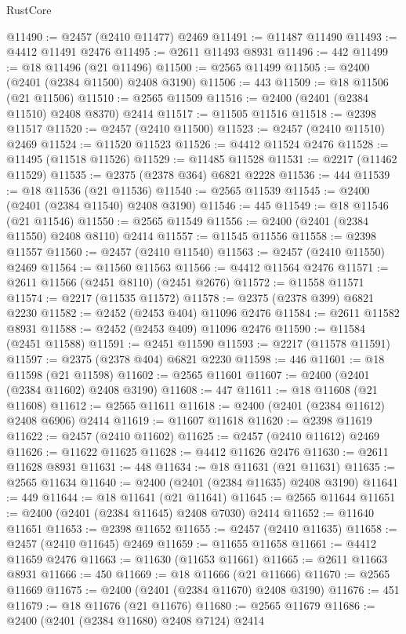 \begin{lexlean}{RustCore}
\begin{coremodule}
@11490 := @2457 (@2410 @11477) @2469
@11491 := @11487 @11490
@11493 := @4412 @11491 @2476
@11495 := @2611 @11493 @8931
@11496 := 442
@11499 := @18 @11496 (@21 @11496)
@11500 := @2565 @11499
@11505 := @2400 (@2401 (@2384 @11500) @2408 @3190)
@11506 := 443
@11509 := @18 @11506 (@21 @11506)
@11510 := @2565 @11509
@11516 := @2400 (@2401 (@2384 @11510) @2408 @8370) @2414
@11517 := @11505 @11516
@11518 := @2398 @11517
@11520 := @2457 (@2410 @11500)
@11523 := @2457 (@2410 @11510) @2469
@11524 := @11520 @11523
@11526 := @4412 @11524 @2476
@11528 := @11495 (@11518 @11526)
@11529 := @11485 @11528
@11531 := @2217 (@11462 @11529)
@11535 := @2375 (@2378 @364) @6821 @2228
@11536 := 444
@11539 := @18 @11536 (@21 @11536)
@11540 := @2565 @11539
@11545 := @2400 (@2401 (@2384 @11540) @2408 @3190)
@11546 := 445
@11549 := @18 @11546 (@21 @11546)
@11550 := @2565 @11549
@11556 := @2400 (@2401 (@2384 @11550) @2408 @8110) @2414
@11557 := @11545 @11556
@11558 := @2398 @11557
@11560 := @2457 (@2410 @11540)
@11563 := @2457 (@2410 @11550) @2469
@11564 := @11560 @11563
@11566 := @4412 @11564 @2476
@11571 := @2611 @11566 (@2451 @8110) (@2451 @2676)
@11572 := @11558 @11571
@11574 := @2217 (@11535 @11572)
@11578 := @2375 (@2378 @399) @6821 @2230
@11582 := @2452 (@2453 @404) @11096 @2476
@11584 := @2611 @11582 @8931
@11588 := @2452 (@2453 @409) @11096 @2476
@11590 := @11584 (@2451 @11588)
@11591 := @2451 @11590
@11593 := @2217 (@11578 @11591)
@11597 := @2375 (@2378 @404) @6821 @2230
@11598 := 446
@11601 := @18 @11598 (@21 @11598)
@11602 := @2565 @11601
@11607 := @2400 (@2401 (@2384 @11602) @2408 @3190)
@11608 := 447
@11611 := @18 @11608 (@21 @11608)
@11612 := @2565 @11611
@11618 := @2400 (@2401 (@2384 @11612) @2408 @6906) @2414
@11619 := @11607 @11618
@11620 := @2398 @11619
@11622 := @2457 (@2410 @11602)
@11625 := @2457 (@2410 @11612) @2469
@11626 := @11622 @11625
@11628 := @4412 @11626 @2476
@11630 := @2611 @11628 @8931
@11631 := 448
@11634 := @18 @11631 (@21 @11631)
@11635 := @2565 @11634
@11640 := @2400 (@2401 (@2384 @11635) @2408 @3190)
@11641 := 449
@11644 := @18 @11641 (@21 @11641)
@11645 := @2565 @11644
@11651 := @2400 (@2401 (@2384 @11645) @2408 @7030) @2414
@11652 := @11640 @11651
@11653 := @2398 @11652
@11655 := @2457 (@2410 @11635)
@11658 := @2457 (@2410 @11645) @2469
@11659 := @11655 @11658
@11661 := @4412 @11659 @2476
@11663 := @11630 (@11653 @11661)
@11665 := @2611 @11663 @8931
@11666 := 450
@11669 := @18 @11666 (@21 @11666)
@11670 := @2565 @11669
@11675 := @2400 (@2401 (@2384 @11670) @2408 @3190)
@11676 := 451
@11679 := @18 @11676 (@21 @11676)
@11680 := @2565 @11679
@11686 := @2400 (@2401 (@2384 @11680) @2408 @7124) @2414

\end{coremodule}
\end{lexlean}
